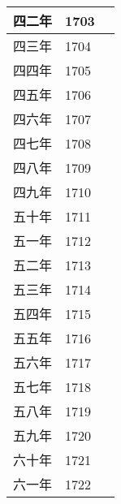 \begin{longtable}{|>{\centering\scriptsize}m{2em}|>{\centering\scriptsize}m{1.3em}|>{\centering}m{8.8em}|}
  四二年 & 1703 & \tabularnewline\hline
  四三年 & 1704 & \tabularnewline\hline
  四四年 & 1705 & \tabularnewline\hline
  四五年 & 1706 & \tabularnewline\hline
  四六年 & 1707 & \tabularnewline\hline
  四七年 & 1708 & \tabularnewline\hline
  四八年 & 1709 & \tabularnewline\hline
  四九年 & 1710 & \tabularnewline\hline
  五十年 & 1711 & \tabularnewline\hline
  五一年 & 1712 & \tabularnewline\hline
  五二年 & 1713 & \tabularnewline\hline
  五三年 & 1714 & \tabularnewline\hline
  五四年 & 1715 & \tabularnewline\hline
  五五年 & 1716 & \tabularnewline\hline
  五六年 & 1717 & \tabularnewline\hline
  五七年 & 1718 & \tabularnewline\hline
  五八年 & 1719 & \tabularnewline\hline
  五九年 & 1720 & \tabularnewline\hline
  六十年 & 1721 & \tabularnewline\hline
  六一年 & 1722 & \tabularnewline
  \bottomrule
\end{longtable}


